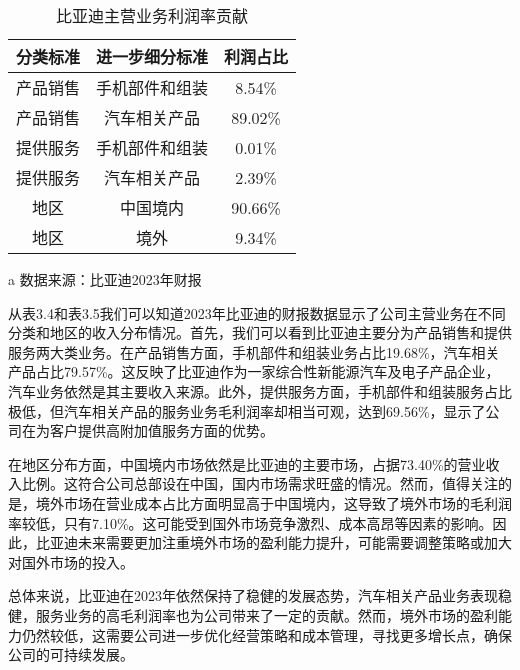 \begin{table}
  \centering
  \begin{threeparttable}[c]
    \caption{比亚迪主营业务利润率贡献}
    \label{tab:profits-rates}
    \begin{tabular}{ccc}
      \toprule
        分类标准 & 进一步细分标准 & 利润占比 \\ 
      \midrule
        产品销售 & 手机部件和组装 & 8.54\% \\ 
        产品销售 & 汽车相关产品 & 89.02\% \\ 
        提供服务 & 手机部件和组装 & 0.01\% \\ 
        提供服务 & 汽车相关产品 & 2.39\% \\ 
        地区 & 中国境内 & 90.66\% \\ 
        地区 & 境外 & 9.34\% \\ 
      \bottomrule
    \end{tabular}
    \begin{tablenotes}
      \item [a] 数据来源：比亚迪2023年财报
    \end{tablenotes}
  \end{threeparttable}
\end{table}
从表3.4和表3.5我们可以知道2023年比亚迪的财报数据显示了公司主营业务在不同分类和地区的收入分布情况。首先，我们可以看到比亚迪主要分为产品销售和提供服务两大类业务。在产品销售方面，手机部件和组装业务占比19.68\%，汽车相关产品占比79.57\%。这反映了比亚迪作为一家综合性新能源汽车及电子产品企业，汽车业务依然是其主要收入来源。此外，提供服务方面，手机部件和组装服务占比极低，但汽车相关产品的服务业务毛利润率却相当可观，达到69.56\%，显示了公司在为客户提供高附加值服务方面的优势。

在地区分布方面，中国境内市场依然是比亚迪的主要市场，占据73.40\%的营业收入比例。这符合公司总部设在中国，国内市场需求旺盛的情况。然而，值得关注的是，境外市场在营业成本占比方面明显高于中国境内，这导致了境外市场的毛利润率较低，只有7.10\%。这可能受到国外市场竞争激烈、成本高昂等因素的影响。因此，比亚迪未来需要更加注重境外市场的盈利能力提升，可能需要调整策略或加大对国外市场的投入。

总体来说，比亚迪在2023年依然保持了稳健的发展态势，汽车相关产品业务表现稳健，服务业务的高毛利润率也为公司带来了一定的贡献。然而，境外市场的盈利能力仍然较低，这需要公司进一步优化经营策略和成本管理，寻找更多增长点，确保公司的可持续发展。